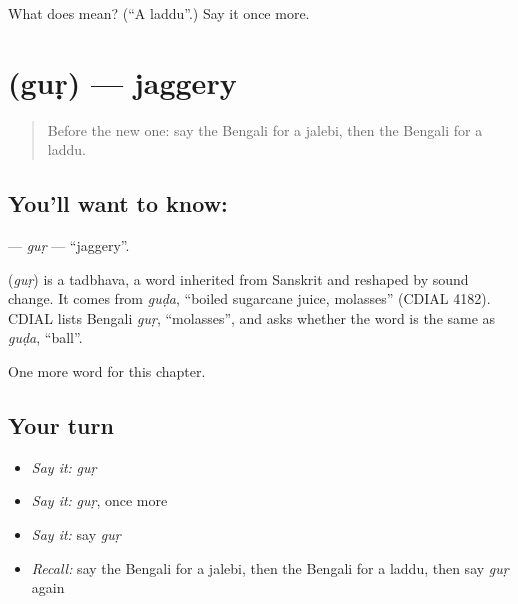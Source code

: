 \begin{tcolorbox}[breakable,colback=teal!4,colframe=teal!35!black,title={Before you move on}]
What does  mean? (\textquotedblleft{}A laddu\textquotedblright{}.) Say it once more.
\end{tcolorbox}
\section[\texorpdfstring{\bn{গুড়} (guṛ)}{গুড় (guṛ)}]{ (guṛ) — jaggery}

\label{lesson:BN-C173-gur}



\begin{quote}
Before the new one: say the Bengali for a jalebi, then the Bengali for a laddu.
\end{quote}

\subsection*{You'll want to know: }
\textbf{} — \emph{guṛ} — \textquotedblleft{}jaggery\textquotedblright{}.

\begin{cousinweb}
\textbf{} (\emph{guṛ}) is a tadbhava, a word inherited from Sanskrit and reshaped by sound change. It comes from \emph{guḍa}, \textquotedblleft{}boiled sugarcane juice, molasses\textquotedblright{} (CDIAL 4182). CDIAL lists Bengali \emph{guṛ}, \textquotedblleft{}molasses\textquotedblright{}, and asks whether the word is the same as \emph{guḍa}, \textquotedblleft{}ball\textquotedblright{}.
\end{cousinweb}

\begin{grammarlens}[title={What you've built}]
One more word for this chapter.
\end{grammarlens}

\subsection*{Your turn}
\begin{itemize}
\raggedright
  \item \emph{Say it:} \emph{guṛ}
  \item \emph{Say it:} \emph{guṛ}, once more
  \item \emph{Say it:} say \emph{guṛ}
  \item \emph{Recall:} say the Bengali for a jalebi, then the Bengali for a laddu, then say \emph{guṛ} again
\end{itemize}

